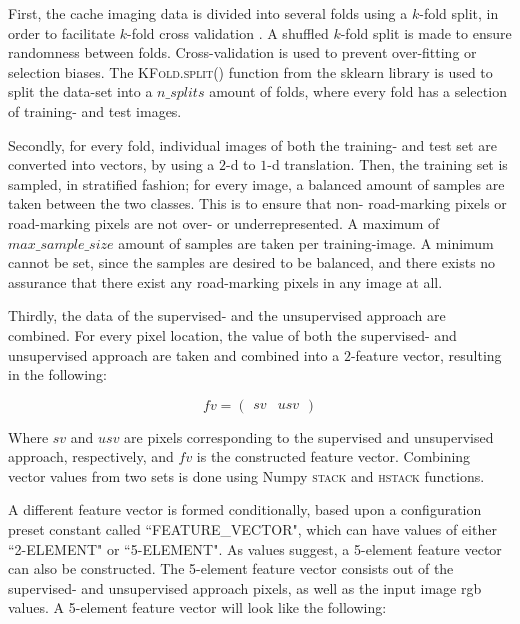First, the cache imaging data is divided into several folds using a $k$-fold split, in order to facilitate $k$-fold cross validation \citep{stone1974cross}. A shuffled $k$-fold split is made to ensure randomness between folds. Cross-validation is used to prevent over-fitting or selection biases. The \textsc{KFold.split()} function from the sklearn library is used to split the data-set into a $n\_splits$ amount of folds, where every fold has a selection of training- and test images.

Secondly, for every fold, individual images of both the training- and test set are converted into vectors, by using a $2$-d to $1$-d translation. Then, the training set is sampled, in stratified fashion; for every image, a balanced amount of samples are taken between the two classes. This is to ensure that non- road-marking pixels or road-marking pixels are not over- or underrepresented. A maximum of $max\_sample\_size$ amount of samples are taken per training-image. A minimum cannot be set, since the samples are desired to be balanced, and there exists no assurance that there exist any road-marking pixels in any image at all.

Thirdly, the data of the supervised- and the unsupervised approach are combined. For every pixel location, the value of both the supervised- and unsupervised approach are taken and combined into a $2$-feature vector, resulting in the following:

$$fv = \begin{pmatrix}sv & usv\end{pmatrix}$$

Where $sv$ and $usv$ are pixels corresponding to the supervised and unsupervised approach, respectively, and $fv$ is the constructed feature vector. Combining vector values from two sets is done using Numpy \textsc{stack} and \textsc{hstack} functions.

A different feature vector is formed conditionally, based upon a configuration preset constant called ``FEATURE\_VECTOR", which can have values of either ``2-ELEMENT" or ``5-ELEMENT". As values suggest, a 5-element feature vector can also be constructed. The 5-element feature vector consists out of the supervised- and unsupervised approach pixels, as well as the input image rgb values. A 5-element feature vector will look like the following:

